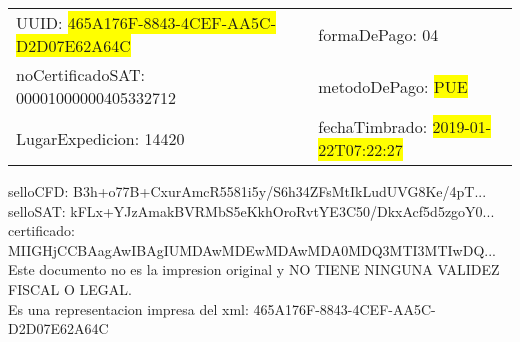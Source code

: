 \documentclass{article}
\begin{document}
\begin{tabular}{p{11cm}p{1cm}p{8cm}}
\bigskip
UUID: \colorbox{yellow}{ 465A176F-8843-4CEF-AA5C-D2D07E62A64C } & & formaDePago: 04\\

noCertificadoSAT: 00001000000405332712 & & metodoDePago: \colorbox{yellow}{ PUE }\\

LugarExpedicion: 14420 & & fechaTimbrado: \colorbox{yellow}{ 2019-01-22T07:22:27 } \\
\end{tabular}

\bigskip
selloCFD: B3h+o77B+CxurAmcR5581i5y/S6h34ZFsMtIkLudUVG8Ke/4pT... \\
selloSAT: kFLx+YJzAmakBVRMbS5eKkhOroRvtYE3C50/DkxAcf5d5zgoY0... \\

certificado: MIIGHjCCBAagAwIBAgIUMDAwMDEwMDAwMDA0MDQ3MTI3MTIwDQ...\bigskip\bigskip\bigskip\bigskip\bigskip\bigskip
\\Este documento no es la impresion original y NO TIENE NINGUNA VALIDEZ FISCAL O LEGAL. \\
 Es una representacion impresa del xml:  465A176F-8843-4CEF-AA5C-D2D07E62A64C \\
\end{document}
